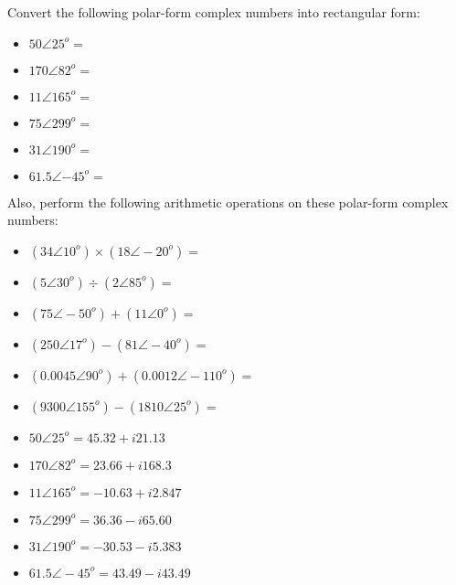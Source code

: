 

Convert the following polar-form complex numbers into rectangular form:

\begin{itemize}
\item{} $50 \angle 25^o = $ 
\vskip 5pt
\item{} $170 \angle 82^o = $ 
\vskip 5pt
\item{} $11 \angle 165^o = $ 
\vskip 5pt
\item{} $75 \angle 299^o = $ 
\vskip 5pt
\item{} $31 \angle 190^o = $ 
\vskip 5pt
\item{} $61.5 \angle {-45}^o = $ 
\end{itemize}

\vskip 10pt

Also, perform the following arithmetic operations on these polar-form complex numbers:

\begin{itemize}
\item{} $(34 \angle 10^o) \times (18 \angle -20^o) = $ 
\vskip 5pt
\item{} $(5 \angle 30^o) \div (2 \angle 85^o) = $ 
\vskip 5pt
\item{} $(75 \angle -50^o) + (11 \angle 0^o) = $ 
\vskip 5pt
\item{} $(250 \angle 17^o) - (81 \angle -40^o) = $ 
\vskip 5pt
\item{} $(0.0045 \angle 90^o) + (0.0012 \angle -110^o) = $ 
\vskip 5pt
\item{} $(9300 \angle 155^o) - (1810 \angle 25^o) = $ 
\end{itemize}








\begin{itemize}
\item{} $50 \angle 25^o = 45.32 + i21.13$ 
\vskip 5pt
\item{} $170 \angle 82^o = 23.66 + i168.3$ 
\vskip 5pt
\item{} $11 \angle 165^o = -10.63 + i2.847$ 
\vskip 5pt
\item{} $75 \angle 299^o = 36.36 - i65.60$ 
\vskip 5pt
\item{} $31 \angle 190^o = -30.53 - i5.383$ 
\vskip 5pt
\item{} $61.5 \angle -45^o = 43.49 - i43.49$ 
\end{itemize}

